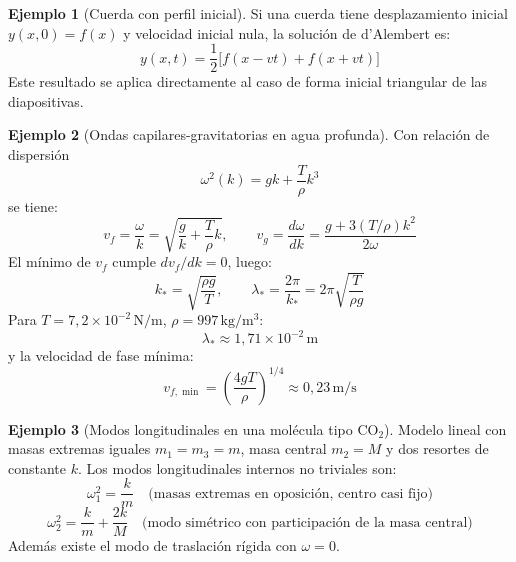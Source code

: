 \documentclass[12pt, a4paper]{article}
\theoremstyle{plain}
\theoremstyle{definition}
\newtheorem{ejemplo}{Ejemplo}[section]
\theoremstyle{remark}
\begin{document}
\begin{ejemplo}[Cuerda con perfil inicial]
Si una cuerda tiene desplazamiento inicial $y(x,0)=f(x)$ y velocidad inicial nula, la solución
de d'Alembert es:
\begin{equation}
  y(x,t)=\frac{1}{2}\bigl[f(x-vt)+f(x+vt)\bigr]
\end{equation}
Este resultado se aplica directamente al caso de forma inicial triangular de las diapositivas.
\end{ejemplo}

\begin{ejemplo}[Ondas capilares-gravitatorias en agua profunda]
Con relación de dispersión
\begin{equation}
  \omega^2(k)=gk+\frac{T}{\rho}k^3
\end{equation}
se tiene:
\begin{equation}
  v_f=\frac{\omega}{k}
     =\sqrt{\frac{g}{k}+\frac{T}{\rho}k},
  \qquad
  v_g=\frac{d\omega}{dk}
     =\frac{g+3(T/\rho)k^2}{2\omega}
\end{equation}
El mínimo de $v_f$ cumple $dv_f/dk=0$, luego:
\begin{equation}
  k_*=\sqrt{\frac{\rho g}{T}},\qquad
  \lambda_*=\frac{2\pi}{k_*}
          =2\pi\sqrt{\frac{T}{\rho g}}
\end{equation}
Para $T=7{,}2\times10^{-2}\,\mathrm{N/m}$, $\rho=997\,\mathrm{kg/m^3}$:
\begin{equation}
  \lambda_* \approx 1{,}71\times10^{-2}\,\mathrm{m}
\end{equation}
y la velocidad de fase mínima:
\begin{equation}
  v_{f,\min}=\left(\frac{4gT}{\rho}\right)^{1/4}\approx 0{,}23\,\mathrm{m/s}
\end{equation}
\end{ejemplo}

\begin{ejemplo}[Modos longitudinales en una molécula tipo CO\texorpdfstring{$_2$}{2}]
Modelo lineal con masas extremas iguales $m_1=m_3=m$, masa central $m_2=M$ y dos resortes
de constante $k$. Los modos longitudinales internos no triviales son:
\begin{equation}
  \omega_1^2=\frac{k}{m}
  \quad\text{(masas extremas en oposición, centro casi fijo)}
\end{equation}
\begin{equation}
  \omega_2^2=\frac{k}{m}+\frac{2k}{M}
  \quad\text{(modo simétrico con participación de la masa central)}
\end{equation}
Además existe el modo de traslación rígida con $\omega=0$.
\end{ejemplo}
\end{document}
